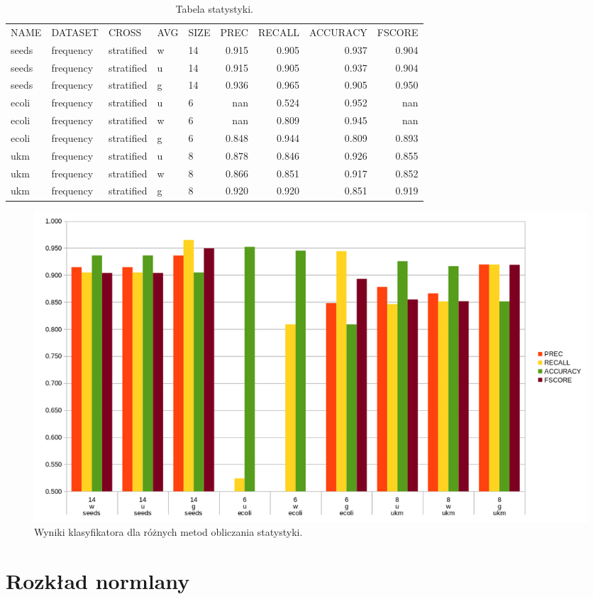 \begin{table}[H]
\centering
\caption{Tabela statystyki.}
\label{table-stats}
\begin{tabular}{lllllrrrr}
NAME  & DATASET   & CROSS      & AVG & SIZE & PREC  & RECALL & ACCURACY & FSCORE \\
seeds & frequency & stratified & w   & 14   & 0.915 & 0.905  & 0.937    & 0.904  \\
seeds & frequency & stratified & u   & 14   & 0.915 & 0.905  & 0.937    & 0.904  \\
seeds & frequency & stratified & g   & 14   & 0.936 & 0.965  & 0.905    & 0.950  \\
ecoli & frequency & stratified & u   & 6    & nan   & 0.524  & 0.952    & nan    \\
ecoli & frequency & stratified & w   & 6    & nan   & 0.809  & 0.945    & nan    \\
ecoli & frequency & stratified & g   & 6    & 0.848 & 0.944  & 0.809    & 0.893  \\
ukm   & frequency & stratified & u   & 8    & 0.878 & 0.846  & 0.926    & 0.855  \\
ukm   & frequency & stratified & w   & 8    & 0.866 & 0.851  & 0.917    & 0.852  \\
ukm   & frequency & stratified & g   & 8    & 0.920 & 0.920  & 0.851    & 0.919 
\end{tabular}
\end{table}
\begin{figure}[H]
	\centering
		\includegraphics[width=1.0\linewidth]{stats.png}
	\caption[Wyniki klasyfikatora dla różnych metod obliczania statystyki.]{Wyniki klasyfikatora dla różnych metod obliczania statystyki.}
	\label{fig:stats}
\end{figure}

\section{Rozkład normlany}

